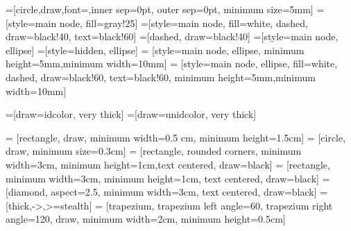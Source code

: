 \usetikzlibrary{
    shapes,
    pgfplots.groupplots,
    shadings,
    calc,
    arrows,
    backgrounds,
    colorbrewer,
    shadows.blur,
    external,
    shapes,
    shapes.arrows,
    shapes.symbols,
    arrows.meta,
    positioning, 
    decorations.pathreplacing,
    intersections,
    cd,
    scopes,
    babel, %
    fit %
}




=[circle,draw,font=\sffamily\small,inner sep=0pt, outer sep=0pt, minimum size=5mm]
=[style=main node, fill=gray!25]
=[style=main node, fill=white, dashed, draw=black!40, text=black!60]
=[dashed, draw=black!40]
=[style=main node,  ellipse]
=[style=hidden, ellipse]
 = [style=main node, ellipse, minimum height=5mm,minimum width=10mm] %
 = [style=main node, ellipse, fill=white, dashed, draw=black!60, text=black!60, minimum height=5mm,minimum width=10mm] %

=[draw=idcolor, very thick]
=[draw=unidcolor, very thick]


 = [rectangle, draw, minimum width=0.5 cm, minimum height=1.5cm]
 = [circle, draw, minimum size=0.3cm]
 = [rectangle, rounded corners, minimum width=3cm, minimum height=1cm,text centered, draw=black]
 = [rectangle, minimum width=3cm, minimum height=1cm, text centered, draw=black]
 = [diamond, aspect=2.5, minimum width=3cm, text centered, draw=black]
 = [thick,->,>=stealth]
 = [trapezium, trapezium left angle=60, trapezium right angle=120, draw,  
      minimum width=2cm, minimum height=0.5cm]



\newcommand\irregularcircle[2]{%
    \pgfextra {\pgfmathsetmacro\len{(#1)+rand*(#2)}}
    +(0:\len pt)
    \foreach \a in {10,20,...,350}{
        \pgfextra {\pgfmathsetmacro\len{(#1)+rand*(#2)}}
        -- +(\a:\len pt)
    } -- cycle
}



\newcommand{\nodew}{50mm}  %